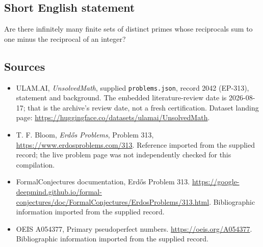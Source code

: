 \documentclass[11pt,a4paper]{article}
\begin{document}
\subsection{Short English statement}

Are there infinitely many finite sets of distinct primes whose reciprocals sum to one minus the reciprocal of an integer?

\subsection{Sources}

{\small

\begin{itemize}

\item[\hypertarget{source:2042:1}{S1}] ULAM.AI, \emph{UnsolvedMath}, supplied \texttt{problems.json}, record 2042 (EP-313), statement and background. The embedded literature-review date is 2026-08-17; that is the archive’s review date, not a fresh certification. Dataset landing page: \url{https://huggingface.co/datasets/ulamai/UnsolvedMath}.

\item[\hypertarget{source:2042:2}{S2}] T. F. Bloom, \emph{Erdős Problems}, Problem 313, \url{https://www.erdosproblems.com/313}. Reference imported from the supplied record; the live problem page was not independently checked for this compilation.

\item[\hypertarget{source:2042:3}{S3}] FormalConjectures documentation, Erdős Problem 313. \url{https://google-deepmind.github.io/formal-conjectures/doc/FormalConjectures/ErdosProblems/313.html}. Bibliographic information imported from the supplied record.

\item[\hypertarget{source:2042:4}{S4}] OEIS A054377, Primary pseudoperfect numbers. \url{https://oeis.org/A054377}. Bibliographic information imported from the supplied record.

\end{itemize}

}

\label{end:2042}
\end{document}
